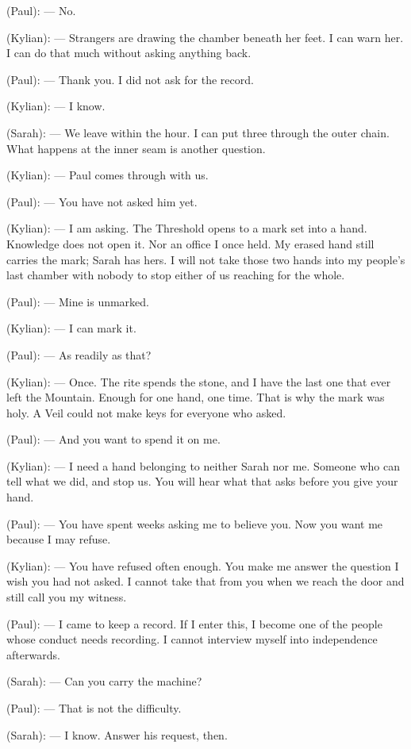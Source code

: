 \begin{room}
(Paul): --- No.

(Kylian): --- Strangers are drawing the chamber beneath her feet. I can warn her. I can do that much without asking anything back.

(Paul): --- Thank you. I did not ask for the record.

(Kylian): --- I know.

(Sarah): --- We leave within the hour. I can put three through the outer chain. What happens at the inner seam is another question.

(Kylian): --- Paul comes through with us.

(Paul): --- You have not asked him yet.

(Kylian): --- I am asking. The Threshold opens to a mark set into a hand. Knowledge does not open it. Nor an office I once held. My erased hand still carries the mark; Sarah has hers. I will not take those two hands into my people's last chamber with nobody to stop either of us reaching for the whole.

(Paul): --- Mine is unmarked.

(Kylian): --- I can mark it.

(Paul): --- As readily as that?

(Kylian): --- Once. The rite spends the stone, and I have the last one that ever left the Mountain. Enough for one hand, one time. That is why the mark was holy. A Veil could not make keys for everyone who asked.

(Paul): --- And you want to spend it on me.

(Kylian): --- I need a hand belonging to neither Sarah nor me. Someone who can tell what we did, and stop us. You will hear what that asks before you give your hand.

(Paul): --- You have spent weeks asking me to believe you. Now you want me because I may refuse.

(Kylian): --- You have refused often enough. You make me answer the question I wish you had not asked. I cannot take that from you when we reach the door and still call you my witness.

(Paul): --- I came to keep a record. If I enter this, I become one of the people whose conduct needs recording. I cannot interview myself into independence afterwards.

(Sarah): --- Can you carry the machine?

(Paul): --- That is not the difficulty.

(Sarah): --- I know. Answer his request, then.


\end{room}

